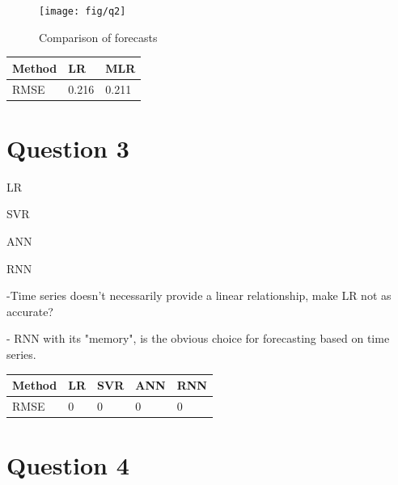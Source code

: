 \documentclass[a4paper, article, oneside, USenglish, IN5460]{memoir}
\begin{document}
\begin{figure}[H]
    \centering
    \texttt{[image: fig/q2]}
    \caption{Comparison of forecasts }
    \label{fig:q2}
\end{figure}


\begin{table}[H]
\begin{tabular}{|l|l|l|}
\hline
Method & LR & MLR  \\ \hline
RMSE   & 0.216  & 0.211    \\ \hline
\end{tabular}
\end{table}


\chapter{Question 3}

LR

SVR

ANN

RNN

-Time series doesn't necessarily provide a linear relationship, make LR not as accurate?

- RNN with its "memory", is the obvious choice for forecasting based on time series.

\begin{table}[H]
\begin{tabular}{|l|l|l|l|l|}
\hline
Method & LR & SVR & ANN & RNN \\ \hline
RMSE   & 0  & 0   & 0   & 0   \\ \hline
\end{tabular}
\end{table}


\chapter{Question 4}
\end{document}
